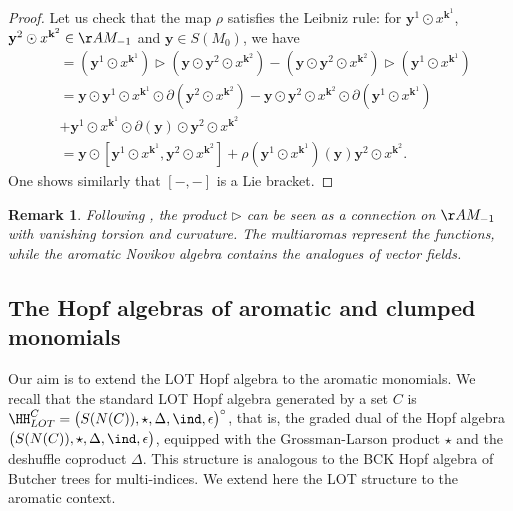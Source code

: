 \documentclass[a4paper,11pt]{article}
\newtheorem{remark}[theorem]{Remark}
\begin{document}
\begin{proof}
Let us check that the map $\rho$ satisfies the Leibniz rule: for $\mathbf y^1 \odot x^{\mathbf k^1}$, $\mathbf y^2 \odot x^{\mathbf k^2}\in \AA M_{-1}$ and $\mathbf y\in S(M_0)$, we have
\begin{align*}
[\mathbf y^1 \odot x^{\mathbf k^1}, \mathbf y \odot \mathbf y^2 \odot x^{\mathbf k^2}]
& = (\mathbf y^1 \odot x^{\mathbf k^1}) \rhd (\mathbf y \odot \mathbf y^2 \odot x^{\mathbf k^2}) - (\mathbf y \odot \mathbf y^2 \odot x^{\mathbf k^2}) \rhd (\mathbf y^1 \odot x^{\mathbf k^1})\\
& = \mathbf y \odot \mathbf y^1 \odot x^{\mathbf k^1} \odot \partial(\mathbf y^2 \odot x^{\mathbf k^2})
- \mathbf y \odot \mathbf y^2 \odot x^{\mathbf k^2} \odot \partial(\mathbf y^1 \odot x^{\mathbf k^1})\\
&+\mathbf y^1 \odot x^{\mathbf k^1} \odot \partial(\mathbf y) \odot \mathbf y^2 \odot x^{\mathbf k^2}\\
& =  \mathbf y\odot [\mathbf y^1 \odot x^{\mathbf k^1}, \mathbf y^2 \odot x^{\mathbf k^2}] + \rho(\mathbf y^1 \odot x^{\mathbf k^1})(\mathbf y) \mathbf y^2 \odot x^{\mathbf k^2}.
\end{align*}
One shows similarly that $[-, -]$ is a Lie bracket.
\end{proof}


\begin{remark}
Following \cite{Grong23pla}, the product $\rhd$ can be seen as a connection on $\AA M_{-1}$ with vanishing torsion and curvature. The multiaromas represent the functions, while the aromatic Novikov algebra contains the analogues of vector fields.
\end{remark}










\subsection{The Hopf algebras of aromatic and clumped monomials}
\label{aroclump}

Our aim is to extend the LOT Hopf algebra \cite{Linares21tsg, Zhu24fna} to the aromatic monomials. We recall that the standard LOT Hopf algebra generated by a set $C$ is $\HH_{LOT}^{C}=\big(S(N(C)), \star, \Delta, \ind, \epsilon\big)^\circ$, that is, the graded dual of the Hopf algebra $\big(S(N(C)), \star, \Delta, \ind, \epsilon \big)$, equipped with the Grossman-Larson product $\star$ and the deshuffle coproduct $\Delta$. This structure is analogous to the BCK Hopf algebra of Butcher trees \cite{Connes98har} for multi-indices. We extend here the LOT structure to the aromatic context.
\end{document}
